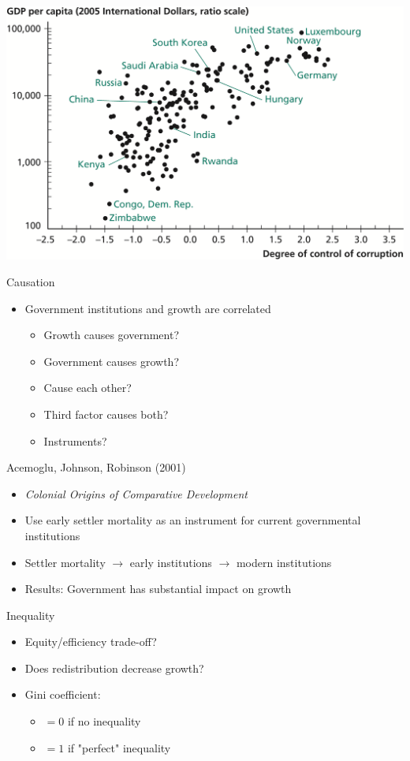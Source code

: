 \documentclass[10pt]{beamer}
\begin{document}
\begin{frame}[label={sec:org14b15ba}]{}
\begin{center}
\includegraphics[width=.75\textwidth]{./img/12.5.png}
\end{center}
\end{frame}

\begin{frame}[label={sec:org06f1358}]{}
\alert{Causation}
\begin{itemize}
\item Government institutions and growth are correlated
\begin{itemize}
\item Growth causes government?
\item Government causes growth?
\item Cause each other?
\item Third factor causes both?
\item Instruments?
\end{itemize}
\end{itemize}
\end{frame}

\begin{frame}[label={sec:orge1992a9}]{}
\alert{Acemoglu, Johnson, Robinson (2001)}
\begin{itemize}
\item \emph{Colonial Origins of Comparative Development}
\item Use early settler mortality as an instrument for current governmental institutions
\item Settler mortality \(\rightarrow\) early institutions \(\rightarrow\) modern institutions
\item Results: Government has substantial impact on growth
\end{itemize}
\end{frame}

\begin{frame}[label={sec:org7371054}]{}
\alert{Inequality}
\begin{itemize}
\item Equity/efficiency trade-off?
\item Does redistribution decrease growth?
\item Gini coefficient:
\begin{itemize}
\item \(=0\) if no inequality
\item \(=1\) if "perfect" inequality
\end{itemize}
\end{itemize}
\end{frame}
\end{document}
